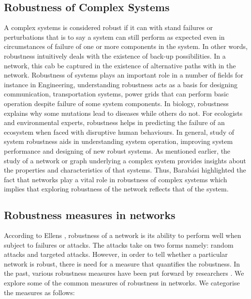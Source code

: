 \documentclass[10pt,a4paper]{article}
\theoremstyle{plain}
\theoremstyle{definition}
\begin{document}
\subsection{Robustness of Complex Systems}
	A complex systems is considered robust if it can with stand failures or perturbations that is to say a system can still perform as expected even in circumstances of failure of one or more components in the system. 
	In other words, robustness intuitively deals with the existence of back-up possibilities. In a network, this cab be captured in the existence of alternative paths with in the network.
	 Robustness of systems plays an important role in a number of fields for instance in Engineering, understanding robustness acts as a basis for designing communication, transportation systems, power grids that can perform basic operation despite failure of some system components. In biology, robustness explains why some mutations lead to diseases while others do not. For ecologists and environmental experts, robustness helps in predicting the failure of an ecosystem when faced with disruptive human behaviours. In general, study of system robustness aids in understanding system operation, improving system performance and designing of new robust systems. 
	As mentioned earlier, the study of a network or graph underlying a complex system provides insights about the properties and characteristics of that systems. Thus, Barab\'{a}si \citep{barabasi2016network} highlighted the fact that networks play a vital role in robustness of complex systems which implies that exploring robustness of the network reflects that of the system.
	 
	\subsection{Robustness measures in networks}
	According to Ellens \citep{ellens2013graph}, robustness of a network is its ability to perform well when subject to failures or attacks. The attacks take on two forms namely: random attacks and targeted attacks. However, in order to tell whether a particular network is robust, there is need for a measure that quantifies the robustness. In the past, various robustness measures have been put forward by researchers \citep{sydney2008elasticity}. We explore some of the common measures of robustness in networks. We categorise the measures as follows:
\end{document}
